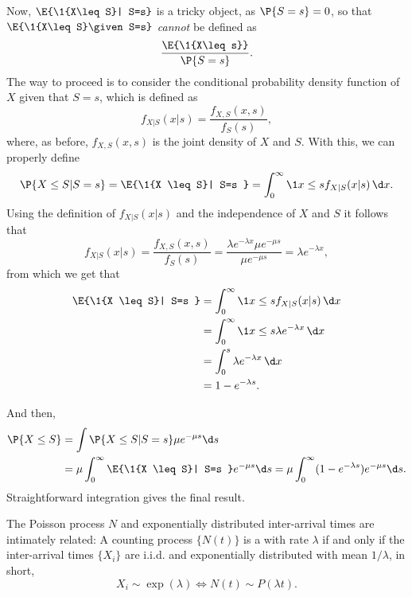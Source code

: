 \begin{exercise}
\begin{solution}
Now, $\E{\1{X\leq S}| S=s}$ is a tricky object, as $\P{S=s} = 0$, so that 
$\E{\1{X\leq S}\given S=s}$ \emph{cannot} be defined as 
\begin{equation*}
\frac{\E{\1{X\leq s}}}{\P{S=s}}.
\end{equation*}
The way to proceed is to consider the conditional probability density function of $X$ given that $S=s$, which is defined as
\begin{equation*}
  f_{X|S}(x|s) = \frac{f_{X, S}( x, s)}{f_S(s)},
\end{equation*}
where, as before, $f_{X, S}( x, s)$ is the joint density of $X$ and $S$. With this, we can properly define
\begin{equation*}
  \begin{split}
  \P{X\leq S| S=s } = \E{\1{X \leq S}| S=s } = \int_0^\infty \1{x \leq s}   f_{X|S}(x|s)\, \d x.
  \end{split}
\end{equation*}
Using the definition of $f_{X|S}(x|s)$ and the independence of $X$ and $S$ it follows that
\begin{equation*}
  f_{X|S}(x|s) = \frac{f_{X, S}( x, s)}{f_S(s)} = \frac{\lambda e^{-\lambda x} \mu e^{-\mu s}}{\mu e^{-\mu s}} = \lambda e^{-\lambda x},
\end{equation*}
from which we get that 
\begin{align*}
  \E{\1{X \leq S}| S=s } 
&= \int_0^\infty \1{x \leq s}   f_{X|S}(x|s)\, \d x \\
&= \int_0^\infty \1{x \leq s} \lambda e^{-\lambda x}\, \d x \\
&= \int_0^s \lambda e^{-\lambda x}\, \d x \\
&= 1 - e^{-\lambda s}.
\end{align*}

And then,  
\begin{equation*}
  \begin{split}
  \P{X\leq S} &= \int \P{X\leq S| S=s} \mu e^{-\mu s}\d s \\
&= \mu \int_0^\infty \E{\1{X \leq S}| S=s } e^{-\mu s} \d s= \mu \int_0^\infty (1 - e^{-\lambda s})e^{-\mu s} \d s.
  \end{split}
\end{equation*}
Straightforward integration gives the final result.
\end{solution}
\end{exercise}



The Poisson process $N$ and exponentially distributed inter-arrival times are intimately related: A counting process $\{N(t)\}$ is a  with rate $\lambda$ if and only if  the inter-arrival times $\{X_i\}$ are i.i.d. and exponentially distributed with mean $1/\lambda$,  in short, 
\begin{equation*}
X_i\sim \exp(\lambda) \Leftrightarrow N(t) \sim P(\lambda t).
\end{equation*}


